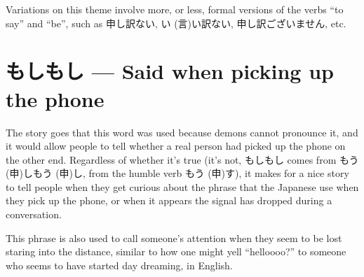 \documentclass[11pt, b5paper, twoside, openright, onecolumn]{book}
\makeatletter
\newcommand*{\rubystack}[2]{{\relscale{0.5}%
  \begin{tabular}[b]{@{}c@{}}%
    {#1}\\%
   {\textscale{2}{#2}}%
  \end{tabular}}%
}
\DeclareRobustCommand*{\ruby}[2]{%
  \mbox{%
    \setlength{\parskip}{0ex}%
    \BeginAccSupp{method=pdfstringdef,ActualText={#1}}%
      \rubystack{\phantom{#2}}{#1}%
      \llap{%
        \rubystack{#2}{\phantom{#1}}%
      }%
    \EndAccSupp{}%
  }%
}
\renewcommand*{\ruby}[2]{#2 (#1)}%
\newcommand{\glsidxheaders}{
	\fancyhead{} %
	\fancyhead[RO,LE]{\thepage}
	\fancyhead[LO,RE]{\nouppercase{\leftmark}}
	\pagestyle{fancy}}
\makeatother
\begin{document}
Variations on this theme involve more‚ or less‚ formal versions of the verbs “to say” and “be”‚ such as 申し訳ない‚ \ruby{言}{い}い訳ない‚ 申し訳ございません‚ etc.

\section*{もしもし — Said when picking up the phone}

The story goes that this word was used because demons cannot pronounce it‚ and it would allow people to tell whether a real person had picked up the phone on the other end. Regardless of whether it’s true (it’s not‚ もしもし comes from \ruby{申}{もう}し\ruby{申}{もう}し‚ from the humble verb \ruby{申}{もう}す)‚ it makes for a nice story to tell people when they get curious about the phrase that the Japanese use when they pick up the phone‚ or when it appears the signal has dropped during a conversation.

This phrase is also used to call someone’s attention when they seem to be lost staring into the distance‚ similar to how one might yell “helloooo?” to someone who seems to have started day dreaming‚ in English.

\backmatter

\glsidxheaders

\cleardoublepage
{}
{}

\printglossaries

\cleardoublepage
{}
{}

\printindex[english]

\printindex[japanese]

\end{document}

